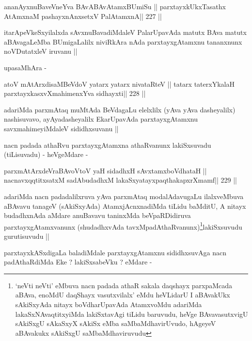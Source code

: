 \begin{shl}
ananAyxnuBaveVneYva BAvABAvAtamxBUmiSu ||
parxtayxkUkxTasathx AtAmxnaM pashayxnAnxsetxV PalAtamxnA\hfill || 227 ||
\end{shl}

\begin{artha}
itarApeVkeSxyilalxda sAvxnuBavadiMdaleV PalarUpavAda matutx BAva
matutx aBAvagaLeMba BUmigaLalilx niviRkAra nAda parxtayxgAtamxnu
tananxnunx noVDutatxleV iruvanu ||

upasaMhAra -
\end{artha}

\begin{shl}
atoV mAtArxdisaMBeVdoV yatarx yatarx nivataRteV ||
tatarx \footnotemark[1]taterxYkalaH parxtayxkasxvXmahimenxYva sidhayxti\hfill || 228 ||
\end{shl}

\begin{artha}
adariMda parxmAtaq muMtAda BeVdagaLu elelxlilx (yAva yAva dasheyalilx)
nashisuvavo, ayAyadasheyalilx EkarUpavAda parxtayxgAtamxnu
savxmahimeyiMdaleV sididhxsuvanu ||

nacn padada athaRvu parxtayxgAtamxna athaRvanunx lakiSxsuvadu
(tiLisuvadu) - heVgeMdare -
\end{artha}

\begin{shl}
parxmAtArxdeVraBAvoV\s toV yaH sidadhxH sAvxtamxboVdhataH ||
nacnavxqqtitxsatxM sadAbudadhxM lakaSxyatayxpaqthakapxrXmamf\hfill || 229 ||
\end{shl}

\begin{artha}
adariMda nacn padadalilxruva yAva parxmAtaq modalAdavugaLu
ilalxveMbuva aBAvavu tanageV (sAkiSxyAda) AtamxjAcnxnadiMda tiLidu
baMditU, A nitayx budadhxnAda aMdare anuBavavu taninxMda
beVpaRDidiruva parxtayxgAtamxvanunx (shudadhxvAda
tavxMpadAthaRvanunx)\footnote[1]{`neVti neVti' eMbuva nacn padada
  athaR sakala daqshayx parxpaMcada aBAva, enoMdU daqShayx
  vasutxvilalx' eMdu heVLidarU I aBAvakUkx sAkiSxyAda nitayx
  boVdharUpavAda AtamxvoMdu adariMda lakaSxNAvaqtitxyiMda lakiSxtavAgi
tiLidu baruvudu, heVge BAvavasutxvigU sAkiSxgU sAkaSxyX sAkiSx eMba
saMbaMdhavirUvudo, hAgeyeV aBAvakukx sAkiSxgU saMbaMdhaviruvudu}lakiSxsuvudu
gurutisuvudu ||
\end{artha}

\begin{artha}
parxtayxkASxdigaLa baladiMdale parxtayxgAtamxnu sididhxsuvAga nacn
padAthaRdiMda Eke ? lakiSxsabeVku ? eMdare -
\end{artha}

